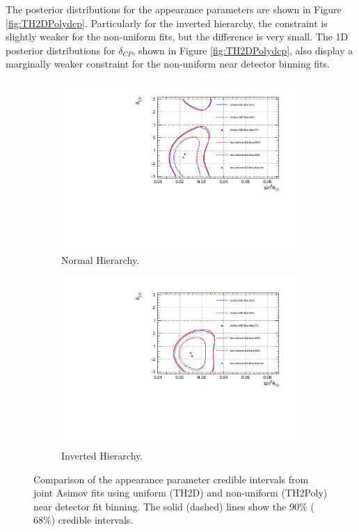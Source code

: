 The posterior distributions for the appearance parameters are shown in Figure \ref{fig:TH2DPolydcp}. Particularly for the inverted hierarchy, the constraint is slightly weaker for the non-uniform fits, but the difference is very small. The 1D posterior distributions for $\delta_{CP}$, shown in Figure \ref{fig:TH2DPolydcp}, also display a marginally weaker constraint for the non-uniform near detector binning fits.

\begin{figure}
\centering
\begin{subfigure}{.7\textwidth}
  \centering
  \includegraphics[width=0.95\linewidth]{figs/comparedmach3contours_PolyvsTH2DKevin/comparedmach3contours_RCeff_app_asimovA_NH}
  \caption{Normal Hierarchy.}
  \label{fig:TH2DPolyAppNH}
\end{subfigure}
\begin{subfigure}{.7\textwidth}
  \centering
  \includegraphics[width=0.95\linewidth]{figs/comparedmach3contours_PolyvsTH2DKevin/comparedmach3contours_RCeff_app_asimovA_IH}
  \caption{Inverted Hierarchy.}
  \label{fig:TH2DPolyAppIH}
\end{subfigure}
\caption{Comparison of the appearance parameter credible intervals from joint Asimov fits using uniform (TH2D) and non-uniform (TH2Poly) near detector fit binning. The solid (dashed) lines show the 90$\%$ ($68\%$) credible intervals.}
\label{fig:TH2DPolyApp}
\end{figure}

